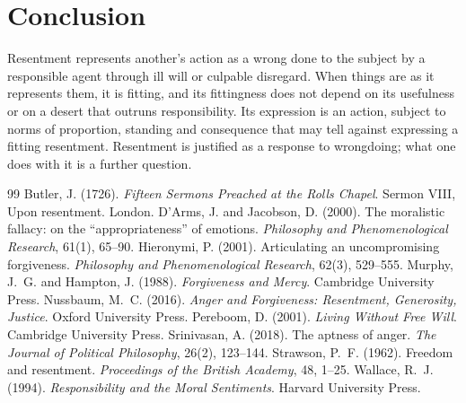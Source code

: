 \documentclass{situationist-preprint}
\begin{document}
\section{Conclusion}

Resentment represents another's action as a wrong done to the subject by a responsible agent through ill will or culpable disregard. When things are as it represents them, it is fitting, and its fittingness does not depend on its usefulness or on a desert that outruns responsibility. Its expression is an action, subject to norms of proportion, standing and consequence that may tell against expressing a fitting resentment. Resentment is justified as a response to wrongdoing; what one does with it is a further question.

\begin{thebibliography}{99}\small
{} Butler, J. (1726). \emph{Fifteen Sermons Preached at the Rolls Chapel}. Sermon VIII, Upon resentment. London.
 D'Arms, J. and Jacobson, D. (2000). The moralistic fallacy: on the \enquote{appropriateness} of emotions. \emph{Philosophy and Phenomenological Research}, 61(1), 65--90.
 Hieronymi, P. (2001). Articulating an uncompromising forgiveness. \emph{Philosophy and Phenomenological Research}, 62(3), 529--555.
 Murphy, J.~G. and Hampton, J. (1988). \emph{Forgiveness and Mercy}. Cambridge University Press.
 Nussbaum, M.~C. (2016). \emph{Anger and Forgiveness: Resentment, Generosity, Justice}. Oxford University Press.
 Pereboom, D. (2001). \emph{Living Without Free Will}. Cambridge University Press.
 Srinivasan, A. (2018). The aptness of anger. \emph{The Journal of Political Philosophy}, 26(2), 123--144.
 Strawson, P.~F. (1962). Freedom and resentment. \emph{Proceedings of the British Academy}, 48, 1--25.
 Wallace, R.~J. (1994). \emph{Responsibility and the Moral Sentiments}. Harvard University Press.
\end{thebibliography}
\end{document}
